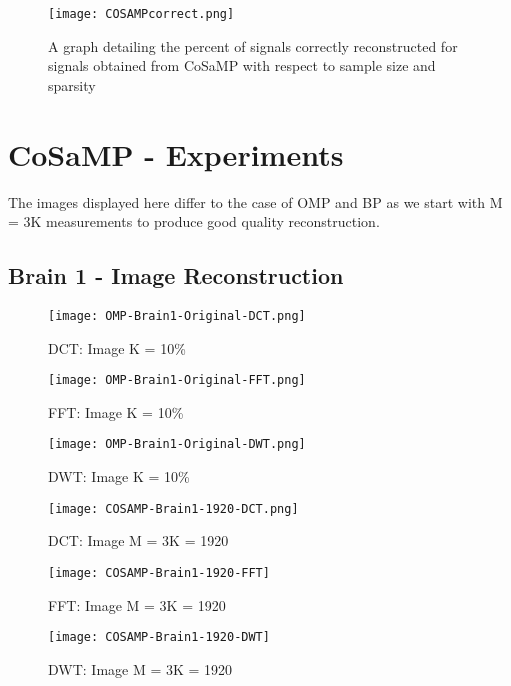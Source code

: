 \documentclass[titlepage,oneside, 12pt]{book}
\theoremstyle{break}
\begin{document}
\begin{figure}[H]
\centering
\centerline{\texttt{[image: COSAMPcorrect.png]}}
\caption{A graph detailing the percent of signals correctly reconstructed for signals obtained from CoSaMP with respect to sample size and sparsity}
\label{fig:correctCOSAMP}
\end{figure}


\clearpage

\section{CoSaMP - Experiments}

The images displayed here differ to the case of OMP and BP as we start with M = 3K measurements to produce good quality reconstruction. 

\subsection{Brain 1 - Image Reconstruction}

\begin{figure}[!h]
\centering
{}
  \texttt{[image: OMP-Brain1-Original-DCT.png]}
  \caption{DCT: Image K = 10\%}\label{fig:COSAMP-Brain1-Original-DCT}
\endminipage
\hspace*{2em}
  \texttt{[image: OMP-Brain1-Original-FFT.png]}
  \caption{FFT: Image K = 10\%}\label{fig:COSAMP-Brain1-Original-FFT}
\endminipage
\hspace*{2em}
%
  \texttt{[image: OMP-Brain1-Original-DWT.png]}
  \caption{DWT: Image K = 10\%}\label{fig:COSAMP-Brain1-Original-DWT}
\endminipage
\hspace*{2em}
\end{figure}

\begin{figure}[!h]
\centering
{}
  \texttt{[image: COSAMP-Brain1-1920-DCT.png]}
  \caption{DCT: Image M = 3K = 1920}\label{fig:COSAMP-Brain1-1920-DCT}
\endminipage
\hspace*{2em}
  \texttt{[image: COSAMP-Brain1-1920-FFT]}
  \caption{FFT: Image M = 3K = 1920}\label{fig:COSAMP-Brain1-1920-FFT}
\endminipage
\hspace*{2em}
%
  \texttt{[image: COSAMP-Brain1-1920-DWT]}
  \caption{DWT: Image M = 3K = 1920}\label{fig:COSAMP-Brain1-1920-DWT}
\endminipage
\hspace*{2em}
\end{figure}
\end{document}
